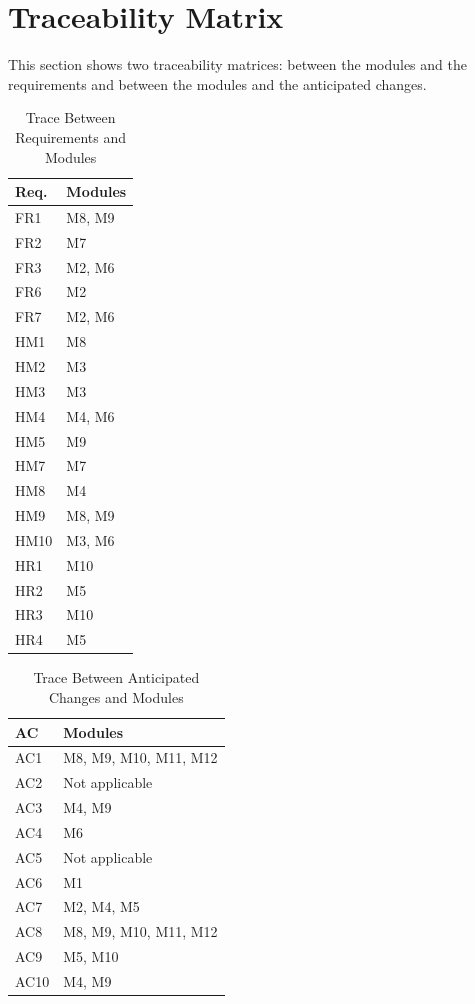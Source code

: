\documentclass[12pt, titlepage]{article}
\begin{document}
\section{Traceability Matrix} \label{SecTM}

This section shows two traceability matrices: between the modules and the
requirements and between the modules and the anticipated changes.

\begin{table}[H]
\centering
\begin{tabular}{p{} p{}}
\toprule
\textbf{Req.} & \textbf{Modules}\\
\midrule
FR1 & M8, M9\\
FR2 & M7\\
FR3 & M2, M6\\
FR6 & M2\\
FR7 & M2, M6\\
HM1 & M8\\
HM2 & M3\\
HM3 & M3\\
HM4 & M4, M6\\
HM5 & M9\\
HM7 & M7\\
HM8 & M4\\
HM9 & M8, M9\\
HM10 & M3, M6\\
HR1 & M10 \\
HR2 & M5 \\
HR3 & M10 \\
HR4 & M5 \\
\bottomrule
\end{tabular}
\caption{Trace Between Requirements and Modules}
\label{TblRT}
\end{table}

\begin{table}[H]
\centering
\begin{tabular}{p{} p{}}
\toprule
\textbf{AC} & \textbf{Modules}\\
\midrule
AC1 & M8, M9, M10, M11, M12\\
AC2 & Not applicable \\
AC3 & M4, M9 \\
AC4 & M6 \\
AC5 & Not applicable \\
AC6 & M1\\
AC7 & M2, M4, M5\\
AC8 & M8, M9, M10, M11, M12\\
AC9 & M5, M10\\
AC10 & M4, M9\\
\bottomrule
\end{tabular}
\caption{Trace Between Anticipated Changes and Modules}
\label{TblACT}
\end{table}
\end{document}
